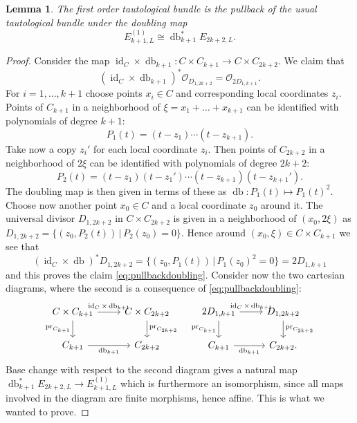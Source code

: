 \documentclass[12pt]{amsart}
\newcounter{thmcounter}
\numberwithin{equation}{section}
\numberwithin{thmcounter}{section}
\newtheorem{lemma}[thmcounter]{Lemma}
\theoremstyle{definition}
\theoremstyle{claim}
\newcommand{\sO}{\mathscr{O}}
\DeclareMathOperator{\id}{id}
\DeclareMathOperator{\pr}{pr}
\begin{document}
\begin{lemma}\label{lem:doublingpullback}
	The first order tautological bundle is the pullback of the usual tautological bundle under the doubling map
	\[ E^{(1)}_{k+1,L} \cong \operatorname{db}_{k+1}^*E_{2k+2,L}. \]
\end{lemma}
\begin{proof}
	Consider the map $\id_C\times \operatorname{db}_{k+1}\colon C\times C_{k+1} \to C\times C_{2k+2}$. We claim that
	\begin{equation}\label{eq:pullbackdoubling}
	(\id_C\times \operatorname{db}_{k+1})^*\sO_{D_{1,2k+2}} = \sO_{2D_{1,k+1}}.
	\end{equation}
	 For $i=1,\dots,k+1$ choose points $x_i\in C$ and corresponding local coordinates $z_i$. Points of $C_{k+1}$ in a neighborhood of $\xi = x_1+\dots+x_{k+1}$ can be identified with polynomials  of degree $k+1$:
	\[P_1(t) = (t-z_1) \cdots (t-z_{k+1}).  \]
	 Take now a copy $z_i'$ for each local coordinate $z_i$. Then points of $C_{2k+2}$ in a neighborhood of $2\xi$ can be identified with  polynomials of degree $2k+2$:
	\[ P_2(t) = (t-z_1)(t-z_1') \cdots (t-z_{k+1})(t-z_{k+1}'). \]
	The doubling map is then given in terms of these as $\operatorname{db}\colon P_1(t)\mapsto P_1(t)^2$. Choose now another point $x_0\in C$ and a local coordinate $z_0$ around it. The universal divisor $D_{1,2k+2}$ in $C\times C_{2k+2}$ is given in a neighborhood of $(x_0,2\xi)$ as $D_{1,2k+2} = \{ (z_0,P_2(t)) \,|\, P_2(z_0)=0 \}$. Hence around $(x_0,\xi)\in C\times C_{k+1}$ we see that
	\[ (\id_C\times \operatorname{db})^*D_{1,2k+2} = \{(z_0,P_1(t)) \,|\, P_1(z_0)^2 = 0 \} = 2D_{1,k+1} \]
	and this proves the claim \eqref{eq:pullbackdoubling}. Consider now the two cartesian diagrams, where the second is a consequence of  \eqref{eq:pullbackdoubling}:
	\begin{equation}
		\begin{tikzcd}
			C\times C_{k+1} \arrow{r}{\id_C\times \operatorname{db}_{k+1}} \arrow[swap]{d}{\pr_{C_{k+1}}}& C\times C_{2k+2} \arrow{d}{\pr_{C_{2k+2}}} \\
			C_{k+1} \arrow{r}[below]{\operatorname{db}_{k+1}} & C_{2k+2}
		\end{tikzcd}
		\quad
		\begin{tikzcd}
			2D_{1,k+1} \arrow{r}{\id_C\times \operatorname{db}_{k+1}} \arrow[swap]{d}{\pr_{C_{k+1}}}& D_{1,2k+2} \arrow{d}{\pr_{C_{2k+2}}} \\
			C_{k+1} \arrow{r}[below]{\operatorname{db}_{k+1}} & C_{2k+2}.
		\end{tikzcd}
	\end{equation}
Base  change with respect to the second diagram gives a natural map $\operatorname{db}_{k+1}^*E_{2k+2,L}\to E^{(1)}_{k+1,L}$ which is furthermore  an isomorphism, since all maps involved in the diagram are finite morphisms, hence affine. This is what we wanted to prove.
 \end{proof}
\end{document}

